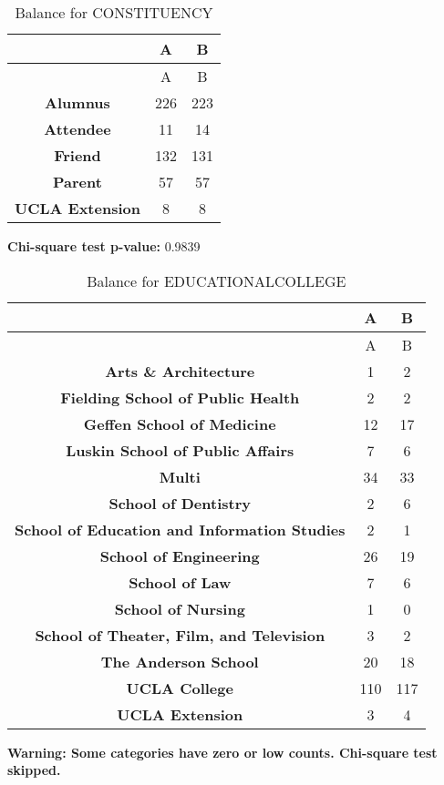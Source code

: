 \documentclass[
]{article}
\begin{document}
\begin{longtable}[]{@{}ccc@{}}
\caption{Balance for CONSTITUENCY}\tabularnewline
\toprule\noalign{}
~ & A & B \\
\midrule\noalign{}
\endfirsthead
\toprule\noalign{}
~ & A & B \\
\midrule\noalign{}
\endhead
\bottomrule\noalign{}
\endlastfoot
\textbf{Alumnus} & 226 & 223 \\
\textbf{Attendee} & 11 & 14 \\
\textbf{Friend} & 132 & 131 \\
\textbf{Parent} & 57 & 57 \\
\textbf{UCLA Extension} & 8 & 8 \\
\end{longtable}

\textbf{Chi-square test p-value:} 0.9839\\
\pagebreak

\begin{longtable}[]{@{}ccc@{}}
\caption{Balance for EDUCATIONALCOLLEGE}\tabularnewline
\toprule\noalign{}
~ & A & B \\
\midrule\noalign{}
\endfirsthead
\toprule\noalign{}
~ & A & B \\
\midrule\noalign{}
\endhead
\bottomrule\noalign{}
\endlastfoot
\textbf{Arts \& Architecture} & 1 & 2 \\
\textbf{Fielding School of Public Health} & 2 & 2 \\
\textbf{Geffen School of Medicine} & 12 & 17 \\
\textbf{Luskin School of Public Affairs} & 7 & 6 \\
\textbf{Multi} & 34 & 33 \\
\textbf{School of Dentistry} & 2 & 6 \\
\textbf{School of Education and Information Studies} & 2 & 1 \\
\textbf{School of Engineering} & 26 & 19 \\
\textbf{School of Law} & 7 & 6 \\
\textbf{School of Nursing} & 1 & 0 \\
\textbf{School of Theater, Film, and Television} & 3 & 2 \\
\textbf{The Anderson School} & 20 & 18 \\
\textbf{UCLA College} & 110 & 117 \\
\textbf{UCLA Extension} & 3 & 4 \\
\end{longtable}

\textbf{Warning: Some categories have zero or low counts. Chi-square
test skipped.} \pagebreak
\end{document}
